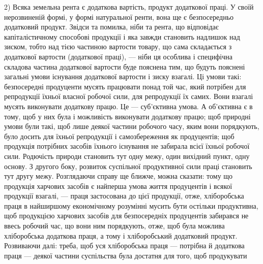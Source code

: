 2) Всяка земельна рента є додаткова вартість, продукт додаткової праці.
У своїй нерозвиненій формі, у формі натуральної ренти, вона ще є безпосередньо
додатковий продукт. Звідси та помилка, ніби та рента, що відповідає капіталістичному
способові продукції і яка завжди становить надлишок над зиском,
тобто над тією частиною вартости товару, що сама складається з додаткової вартости
(додаткової праці), — ніби ця особлива і специфічна складова частина додаткової
вартости буде пояснена тим, що будуть пояснені загальні умови існування додаткової
вартости і зиску взагалі. Ці умови такі: безпосередні продуценти мусять працювати
понад той час, який потрібен для репродукції їхньої власної робочої
сили, для репродукції їх самих. Вони взагалі мусять виконувати додаткову працю.
Це — суб’єктивна умова. А об’єктивна є в тому, щоб у них була і можливість
виконувати додаткову працю; щоб природні умови були такі, щоб лише деякої
частини робочого часу, яким вони порядкують, було досить для їхньої репродукції
і самозбереження як продуцентів; щоб продукція потрібних засобів їхнього
існування не забирала всієї їхньої робочої сили. Родючість природи становить
тут одну межу, один вихідний пункт, одну основу. З другого боку, розвиток суспільної
продуктивної сили праці становить тут другу межу. Розглядаючи справу
ще ближче, можна сказати: тому що продукція харчових засобів є найперша умова
життя продуцентів і всякої продукції взагалі, — праця застосована до цієї продукції,
отже, хліборобська праця в найширшому економічному розумінні мусить бути
остільки продуктивна, щоб продукцією харчових засобів для безпосередніх продуцентів
забирався не ввесь робочий час, що вони ним порядкують, отже, щоб була
можлива хліборобська додаткова праця, а тому і хліборобський додатковий продукт.
Розвиваючи далі: треба, щоб уся хліборобська праця — потрібна й додаткова
праця — деякої частини суспільства була достатня для того, щоб продукувати
\parbreak{}  %
